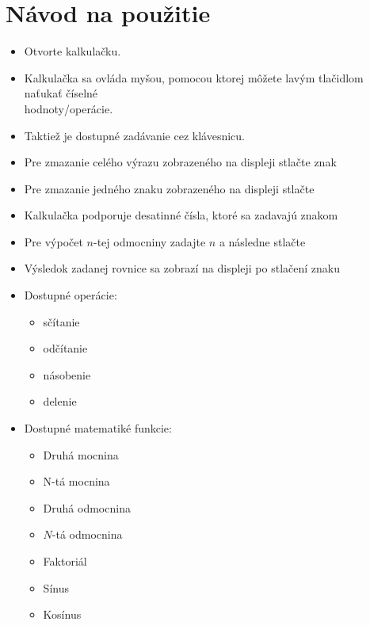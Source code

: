 \documentclass[11pt, a4paper]{article}
\begin{document}
    \section*{Návod na použitie}
    \begin{itemize}
        \item Otvorte kalkulačku.
        \item Kalkulačka sa ovláda myšou, pomocou ktorej môžete lavým tlačidlom naťukať číselné\\hodnoty/operácie.
        \item Taktiež je dostupné zadávanie cez klávesnicu.
        \item Pre zmazanie celého výrazu zobrazeného na displeji stlačte znak 
        \item Pre zmazanie jedného znaku zobrazeného na displeji stlačte  
        \item Kalkulačka podporuje desatinné čísla, ktoré sa zadavajú znakom \fbox{\textbf{ , }}
        \item Pre výpočet $n$-tej odmocniny zadajte $n$ a následne stlačte  
        \item Výsledok zadanej rovnice sa zobrazí na displeji po stlačení znaku \fbox{ $ = $ }
        \item Dostupné operácie:
        \begin{itemize}
            \item sčítanie \fbox{\ $+$\ } 
            \item odčítanie \fbox{\ $-$\ } 
            \item násobenie \fbox{\ $\times$\ } 
            \item delenie \fbox{\ $\div$\ } 
        \end{itemize}
        \item Dostupné matematiké funkcie:
        \begin{itemize}
            \item Druhá mocnina   
            \item N-tá mocnina   
            \item Druhá odmocnina   
            \item $N$-tá odmocnina   
            \item Faktoriál  \fbox{\ $!$\ } 
            \item Sínus   
            \item Kosínus   

\end{itemize}
\end{itemize}
\end{document}
